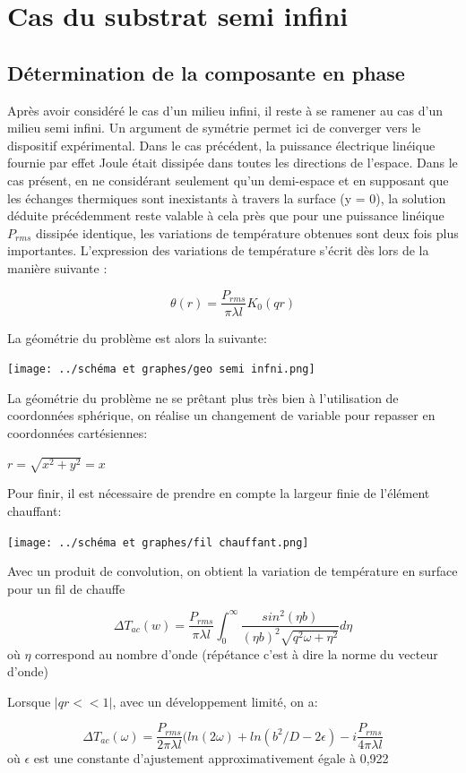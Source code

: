 \documentclass[10pt,a4paper]{report}
\begin{document}
\section{Cas du substrat semi infini}
\subsection{Détermination de la composante en phase}
Après avoir considéré le cas d’un milieu infini, il reste à se ramener au cas d'un milieu semi infini.
Un argument de symétrie permet ici de converger vers le dispositif expérimental. Dans le cas précédent, la puissance électrique linéique fournie par effet Joule était dissipée dans toutes les directions de l'espace. Dans le cas présent, en ne considérant seulement qu'un demi-espace et en supposant que les échanges thermiques sont inexistants à travers la surface (y = 0), la solution déduite précédemment reste valable à cela près que pour une puissance linéique $P_{rms}$ dissipée identique, les variations de température obtenues sont deux fois plus importantes. L'expression des variations de température s'écrit dès lors de la manière suivante :
\begin{center}
\begin{equation}
\theta(r)=\frac{P_{rms}}{\pi\lambda l}K_{0}(qr)
\end{equation}
\end{center}
La géométrie du problème est alors la suivante:
\begin{center}
\texttt{[image: ../schéma et graphes/geo semi infni.png]}
\label{fig3}
\end{center}
La géométrie du problème ne se prêtant plus très bien à l’utilisation de coordonnées sphérique, on réalise un changement de variable pour repasser en coordonnées cartésiennes:
\begin{center}
$r=\sqrt{x^2+y^2}=x$
\end{center}
Pour finir, il est nécessaire de prendre en compte la largeur finie de l'élément chauffant:
\begin{center}
\texttt{[image: ../schéma et graphes/fil chauffant.png]}
\label{fig4}
\end{center}
Avec un produit de convolution, on obtient la variation de température en surface pour un fil de chauffe
\begin{center}
\begin{equation}
\Delta T_{ac}(w)=\frac{P_{rms}}{\pi\lambda l}\int_{0}^\infty \frac{sin^2(\eta b)}{(\eta b)^2\sqrt{q^2\omega+\eta^2}}d\eta
\end{equation}
où $\eta$ correspond au nombre d'onde (répétance c'est à dire la norme du vecteur d'onde)
\end{center}
Lorsque $\lvert qr<<1 \rvert$, avec un développement limité, on a:
\begin{center}
\begin{equation}
\Delta T_{ac}(\omega)=\frac{P_{rms}}{2\pi\lambda l}(ln(2\omega)+ln(b^2/D-2\epsilon)-i\frac{P_{rms}}{4\pi\lambda l}
\end{equation}
où $\epsilon$ est une constante d'ajustement approximativement égale à 0,922
\end{center}
\end{document}
